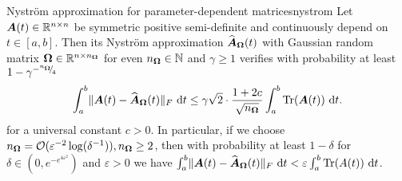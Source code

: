 \documentclass[12pt]{article}
\begin{document}
\begin{lemma}{Nyström approximation for parameter-dependent matrices}{nystrom}
    Let $\boldsymbol{A}(t) \in \mathbb{R}^{n \times n}$ be symmetric positive semi-definite and continuously depend on $t \in [a, b]$. Then its Nyström approximation $\widehat{\boldsymbol{A}}_{\boldsymbol{\Omega}}(t)$ with Gaussian random matrix $\boldsymbol{\Omega} \in \mathbb{R}^{n \times n_{\boldsymbol{\Omega}}}$ for even $n_{\boldsymbol{\Omega}} \in \mathbb{N}$ and $\gamma \geq 1$ verifies with probability at least $1 - \gamma^{-{}^{n_{\boldsymbol{\Omega}}}{\mskip -5mu/\mskip -3mu}_{4}}$
    \begin{equation}
        \int_{a}^{b} \lVert \boldsymbol{A}(t) - \widehat{\boldsymbol{A}}_{\boldsymbol{\Omega}}(t) \rVert _F~\mathrm{d}t \leq \gamma \sqrt{2} \cdot \frac{1 + 2c}{\sqrt{n_{\boldsymbol{\Omega}}}} \int_{a}^{b} \operatorname{Tr}(\boldsymbol{A}(t))~\mathrm{d}t.
    \end{equation}
    for a universal constant $c > 0$. In particular, if we choose $n_{\boldsymbol{\Omega}} = \mathcal{O}(\varepsilon^{-2} \log(\delta^{-1})), n_{\boldsymbol{\Omega}} \geq 2$, then with probability at least $1-\delta$ for $\delta \in (0, e^{-e^{4 \varepsilon^2}})$ and $\varepsilon > 0$ we have $\int_{a}^{b} \lVert \boldsymbol{A}(t) - \widehat{\boldsymbol{A}}_{\boldsymbol{\Omega}}(t) \rVert _F~\mathrm{d}t  < \varepsilon \int_{a}^{b} \operatorname{Tr}(A(t))~\mathrm{d}t$.
\end{lemma}

\end{document}
